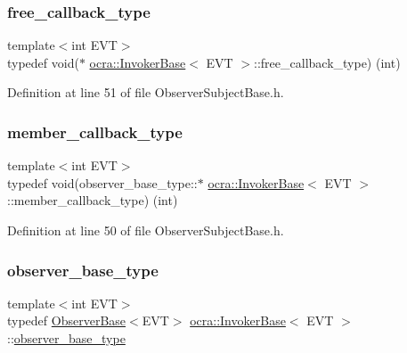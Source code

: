 \subsubsection{\texorpdfstring{free\+\_\+callback\+\_\+type}{free\_callback\_type}}
{\footnotesize\ttfamily template$<$int E\+VT$>$ \\
typedef void($\ast$ \hyperlink{classocra_1_1InvokerBase}{ocra\+::\+Invoker\+Base}$<$ E\+VT $>$\+::free\+\_\+callback\+\_\+type) (int)\hspace{0.3cm}{\ttfamily [protected]}}



Definition at line 51 of file Observer\+Subject\+Base.\+h.

\hypertarget{classocra_1_1InvokerBase_ab20a012fb61b3ffde70547b1f696f3bc}{}\label{classocra_1_1InvokerBase_ab20a012fb61b3ffde70547b1f696f3bc} 
\subsubsection{\texorpdfstring{member\+\_\+callback\+\_\+type}{member\_callback\_type}}
{\footnotesize\ttfamily template$<$int E\+VT$>$ \\
typedef void(observer\+\_\+base\+\_\+type\+::$\ast$ \hyperlink{classocra_1_1InvokerBase}{ocra\+::\+Invoker\+Base}$<$ E\+VT $>$\+::member\+\_\+callback\+\_\+type) (int)\hspace{0.3cm}{\ttfamily [protected]}}



Definition at line 50 of file Observer\+Subject\+Base.\+h.

\hypertarget{classocra_1_1InvokerBase_a186d1d95173d5875d4cdf113312d3b12}{}\label{classocra_1_1InvokerBase_a186d1d95173d5875d4cdf113312d3b12} 
\subsubsection{\texorpdfstring{observer\+\_\+base\+\_\+type}{observer\_base\_type}}
{\footnotesize\ttfamily template$<$int E\+VT$>$ \\
typedef \hyperlink{classocra_1_1ObserverBase}{Observer\+Base}$<$E\+VT$>$ \hyperlink{classocra_1_1InvokerBase}{ocra\+::\+Invoker\+Base}$<$ E\+VT $>$\+::\hyperlink{classocra_1_1InvokerBase_a186d1d95173d5875d4cdf113312d3b12}{observer\+\_\+base\+\_\+type}\hspace{0.3cm}{\ttfamily [protected]}}



